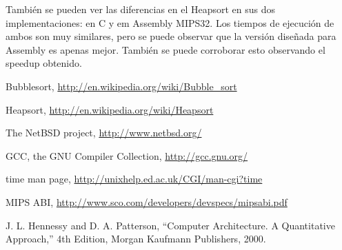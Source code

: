 \documentclass{article}
\begin{document}
	También se pueden ver las diferencias en el Heapsort en sus dos implementaciones: en C y em Assembly MIPS32. Los tiempos de ejecución de ambos son muy similares, pero se puede observar que la versión diseñada para Assembly es apenas mejor. También se puede corroborar esto observando el speedup obtenido.

\bigskip


\begin{thebibliography}{99}

	 Bubblesort, \url{http://en.wikipedia.org/wiki/Bubble_sort}

	 Heapsort, \url{http://en.wikipedia.org/wiki/Heapsort}

	 The NetBSD project, \url{http://www.netbsd.org/}

	 GCC, the GNU Compiler Collection, \url{http://gcc.gnu.org/}

	 time man page, \url{http://unixhelp.ed.ac.uk/CGI/man-cgi?time}

	 MIPS ABI, \url{http://www.sco.com/developers/devspecs/mipsabi.pdf}

	 J. L. Hennessy and D. A. Patterson, ``Computer Architecture. A Quantitative
	Approach,'' 4th Edition, Morgan Kaufmann Publishers, 2000.

	\end{thebibliography}

\newpage
\end{document}
